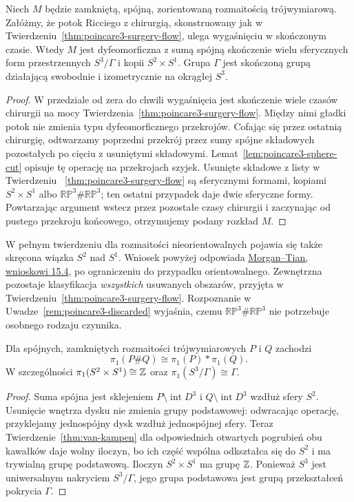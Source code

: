 \begin{wniosek}
\label{thm:poincare3-reconstruction}
Niech $M$ będzie zamkniętą, spójną,
zorientowaną rozmaitością trójwymiarową. Załóżmy, że
potok Ricciego z chirurgią, skonstruowany
jak w Twierdzeniu~\ref{thm:poincare3-surgery-flow},
ulega wygaśnięciu w skończonym czasie.
Wtedy $M$ jest dyfeomorficzna z sumą spójną
skończenie wielu sferycznych form
przestrzennych $S^3/\Gamma$ i kopii
$S^2\times S^1$. Grupa $\Gamma$ jest
skończoną grupą działającą swobodnie
i izometrycznie na okrągłej $S^3$.
\end{wniosek}
\begin{proof}
W przedziale od zera do chwili wygaśnięcia
jest skończenie wiele czasów chirurgii na mocy
Twierdzenia~\ref{thm:poincare3-surgery-flow}.
Między nimi gładki potok nie zmienia typu
dyfeomorficznego przekrojów. Cofając się
przez ostatnią chirurgię, odtwarzamy poprzedni
przekrój przez sumy spójne składowych
pozostałych po cięciu z usuniętymi składowymi.
Lemat~\ref{lem:poincare3-sphere-cut}
opisuje tę operację na przekrojach szyjek.
Usunięte składowe z listy w Twierdzeniu
~\ref{thm:poincare3-surgery-flow} są sferycznymi
formami, kopiami $S^2\times S^1$ albo
$\mathbb{RP}^3\#\mathbb{RP}^3$; ten ostatni
przypadek daje dwie sferyczne formy.
Powtarzając argument wstecz przez pozostałe
czasy chirurgii i zaczynając od pustego
przekroju końcowego, otrzymujemy podany
rozkład $M$.
\end{proof}

W pełnym twierdzeniu dla rozmaitości
nieorientowalnych pojawia się także skręcona
wiązka $S^2$ nad $S^1$. Wniosek powyżej
odpowiada
\href{https://www.claymath.org/library/monographs/cmim03.pdf}
{Morgan--Tian, wnioskowi 15.4},
po ograniczeniu do przypadku orientowalnego.
Zewnętrzna pozostaje klasyfikacja
\emph{wszystkich} usuwanych obszarów,
przyjęta w Twierdzeniu~\ref{thm:poincare3-surgery-flow}.
Rozpoznanie w
Uwadze~\ref{rem:poincare3-discarded}
wyjaśnia, czemu $\mathbb{RP}^3\#\mathbb{RP}^3$
nie potrzebuje osobnego rodzaju czynnika.

\begin{lemat}
\label{lem:poincare3-pi1-sum}
Dla spójnych, zamkniętych rozmaitości trójwymiarowych
$P$ i $Q$ zachodzi
\[
 \pi_1(P\#Q)\cong\pi_1(P)*\pi_1(Q).
\]
W szczególności
$\pi_1(S^2\times S^1)\cong\mathbb{Z}$ oraz
$\pi_1(S^3/\Gamma)\cong\Gamma$.
\end{lemat}
\begin{proof}
Suma spójna jest sklejeniem
$P\setminus\operatorname{int}D^3$ i
$Q\setminus\operatorname{int}D^3$ wzdłuż
sfery $S^2$. Usunięcie wnętrza dysku
nie zmienia grupy podstawowej:
odwracając operację, przyklejamy
jednospójny dysk wzdłuż jednospójnej
sfery. Teraz Twierdzenie~\ref{thm:van-kampen}
dla odpowiednich otwartych pogrubień
obu kawałków daje wolny iloczyn, bo ich
część wspólna odkształca się do $S^2$
i ma trywialną grupę podstawową.
Iloczyn $S^2\times S^1$ ma grupę $\mathbb{Z}$.
Ponieważ $S^3$ jest uniwersalnym nakryciem
$S^3/\Gamma$, jego grupa podstawowa
jest grupą przekształceń pokrycia $\Gamma$.
\end{proof}


